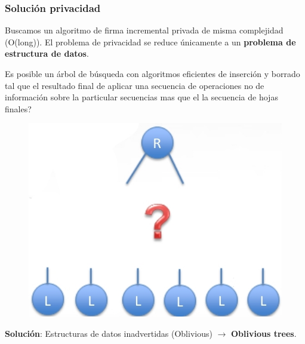 \documentclass[10pt]{beamer}
\begin{document}
\begin{frame}
\frametitle{Solución privacidad}
Buscamos un algoritmo de firma incremental privada de misma complejidad (O(long)).
El problema de privacidad se reduce únicamente a un \textbf{problema de estructura de datos}.

\pause
Es posible un árbol de búsqueda con algoritmos eficientes de inserción y borrado tal que el
resultado final de aplicar una secuencia de operaciones no de información sobre la particular
secuencias mas que el la secuencia de hojas finales?
\begin{figure}[h!]
    \centering
    \includegraphics[scale=0.2]{conc.jpg}
\end{figure}
\pause
\begin{mdframed}[backgroundcolor=frenchblue!20]
\textbf{Solución}: Estructuras de datos inadvertidas (Oblivious) $\to$ \textbf{Oblivious trees}.
\end{mdframed}
\end{frame}



\end{document}
